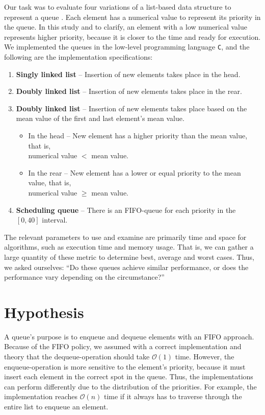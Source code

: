 \documentclass[a4paper,11pt]{kth-mag}
\newcommand*{\skippara}{\par\vspace{\baselineskip} \noindent}
\begin{document}
\skippara Our task was to evaluate four variations of a list-based data structure to represent a queue \cite{Uppgiftl9:online}.
Each element has a numerical value to represent its priority in the queue.
In this study and to clarify, an element with a low numerical value represents higher priority, because it is closer to the time and ready for execution.
We implemented the queues in the low-level programming language \texttt{C}, and the following are the implementation specifications:
\begin{enumerate}
    \item \textbf{Singly linked list} -- Insertion of new elements takes place in the head.
    \item \textbf{Doubly linked list} -- Insertion of new elements takes place in the rear.
        \item \textbf{Doubly linked list} -- Insertion of new elements takes place based on the mean value of the first and last element's mean value.
        \begin{itemize}
            \item In the head -- New element has a higher priority than the mean value, that is, \\numerical value $<$ mean value.
            \item In the rear -- New element has a lower or equal priority to the mean value, that is,\\numerical value $\ge$ mean value.
        \end{itemize}
    \item \textbf{Scheduling queue} -- There is an FIFO-queue for each priority in the $[0,40]$ interval.
\end{enumerate}


\skippara The relevant parameters to use and examine are primarily time and space for algorithms, such as execution time and memory usage.
That is, we can gather a large quantity of these metric to determine best, average and worst cases.
Thus, we asked ourselves: ``Do these queues achieve similar performance, or does the performance vary depending on the circumstance?''


\clearpage
\section{Hypothesis}
A queue's purpose is to enqueue and dequeue elements with an FIFO approach.
Because of the FIFO policy, we assumed with a correct implementation and theory that the dequeue-operation should take $\mathcal{O}(1)$ time.
However, the enqueue-operation is more sensitive to the element's priority, because it must insert each element in the correct spot in the queue.
Thus, the implementations can perform differently due to the distribution of the priorities.
For example, the implementation reaches $\mathcal{O}(n)$ time if it always has to traverse through the entire list to enqueue an element.
\end{document}
